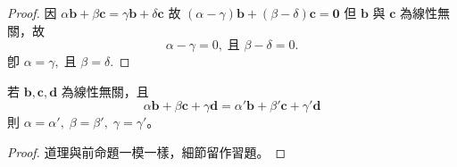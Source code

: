 \begin{proof}
因 $\alpha \mathbf{b} + \beta \mathbf{c} = \gamma \mathbf{b} + \delta \mathbf{c}$
故 $(\alpha - \gamma)\mathbf{b} + (\beta - \delta)\mathbf{c} = \mathbf{0}$
但 $\mathbf{b}$ 與 $\mathbf{c}$ 為線性無關，故
\[ \alpha - \gamma = 0,\; \text{且 } \beta - \delta = 0. \]
卽 $\alpha = \gamma,\; \text{且 } \beta = \delta.$
\end{proof}

\begin{prop}
\label{prop:b3-5-2}
若 $\mathbf{b}, \mathbf{c}, \mathbf{d}$ 為線性無關，且
\[ \alpha \mathbf{b} + \beta \mathbf{c} + \gamma \mathbf{d} = \alpha'\mathbf{b} + \beta'\mathbf{c} + \gamma'\mathbf{d} \]
則 $\alpha = \alpha',\; \beta = \beta',\; \gamma = \gamma'$。
\end{prop}
\begin{proof}
道理與前命題一模一樣，細節留作習題。
\end{proof}

